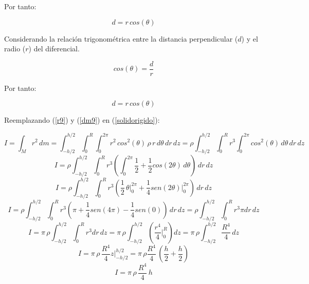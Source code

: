 \documentclass[letter,oneside,11pt]{article}
\begin{document}
Por tanto:

\begin{equation}
    d = r\, cos(\theta)
\label{r13}
\end{equation}

Considerando la relación trigonométrica entre la distancia perpendicular ($d$) y
el radio ($r$) del diferencial.

\begin{equation*}
    cos (\theta) = \frac{d}{r}
\end{equation*}

Por tanto:

\begin{equation}
    d = r\, cos(\theta)
\label{r9}
\end{equation}

Reemplazando (\ref{r9}) y (\ref{dm9}) en (\ref{solidorigido}): 

\begin{equation*}
    I = \int_{M} r^2\, dm = \int_{-h/2}^{h/2} \int_{0}^{R} \int_{0}^{2\pi} r^2\, cos^2(\theta)\, \rho\, r\, d\theta\, dr\, dz = \rho \int_{-h/2}^{h/2} \int_{0}^{R} r^3 \int_{0}^{2\pi} cos^2(\theta)\, d\theta\, dr\, dz
\end{equation*}
\begin{equation*}
    I = \rho \int_{-h/2}^{h/2} \int_{0}^{R} r^3 \left( \int_{0}^{2\pi} \frac{1}{2} + \frac{1}{2} cos(2\theta) \, d\theta \right) \, dr\, dz
\end{equation*}
\begin{equation*}
    I = \rho \int_{-h/2}^{h/2} \int_{0}^{R} r^3 \left( \frac{1}{2}\, \theta \Biggr|_{0}^{2\pi} + \frac{1}{4} sen(2\theta) \Biggr|_{0}^{2\pi} \right) \, dr\, dz
\end{equation*}
\begin{equation*}
    I = \rho \int_{-h/2}^{h/2} \int_{0}^{R} r^3 \left( \pi + \frac{1}{4} sen(4\pi) - \frac{1}{4} sen(0) \right) \, dr\, dz = \rho \int_{-h/2}^{h/2} \int_{0}^{R} r^3 \pi dr\, dz
\end{equation*}
\begin{equation*}
    I = \pi\, \rho \int_{-h/2}^{h/2} \int_{0}^{R} r^3 dr\, dz = \pi\, \rho \int_{-h/2}^{h/2} \left( \frac{r^4}{4} \Biggr|_{0}^{R} \right) dz = \pi\, \rho \int_{-h/2}^{h/2} \frac{R^4}{4}\, dz
\end{equation*}
\begin{equation*}
    I = \pi\, \rho\, \frac{R^4}{4} z \Biggr|_{-h/2}^{h/2} = \pi\, \rho \frac{R^4}{4}\, \left( \frac{h}{2} + \frac{h}{2} \right)
\end{equation*}
\begin{equation}
    I = \pi\, \rho\, \frac{R^4}{4}\, h
\label{resultado13}
\end{equation}
\end{document}
